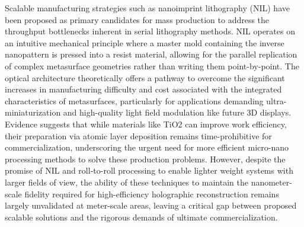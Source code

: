 Scalable manufacturing strategies such as nanoimprint lithography (NIL) have been proposed as primary candidates for mass production to address the throughput bottlenecks inherent in serial lithography methods. NIL operates on an intuitive mechanical principle where a master mold containing the inverse nanopattern is pressed into a resist material, allowing for the parallel replication of complex metasurface geometries rather than writing them point-by-point. \citep{doi_10_3390_encyclopedia5040197_fe6bfdc9} \citep{doi_10_5772_intechopen_72534_9965e900} The optical architecture theoretically offers a pathway to overcome the significant increases in manufacturing difficulty and cost associated with the integrated characteristics of metasurfaces, particularly for applications demanding ultra-miniaturization and high-quality light field modulation like future 3D displays. Evidence suggests that while materials like TiO2 can improve work efficiency, their preparation via atomic layer deposition remains time-prohibitive for commercialization, underscoring the urgent need for more efficient micro-nano processing methods to solve these production problems. However, despite the promise of NIL and roll-to-roll processing to enable lighter weight systems with larger fields of view, the ability of these techniques to maintain the nanometer-scale fidelity required for high-efficiency holographic reconstruction remains largely unvalidated at meter-scale areas, leaving a critical gap between proposed scalable solutions and the rigorous demands of ultimate commercialization. \citep{doi_10_1515_nanoph_2025_0269_b999ce93}

